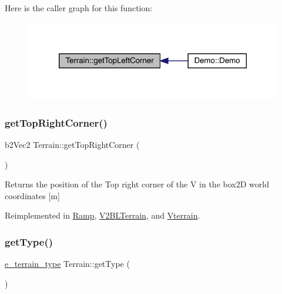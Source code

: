 Here is the caller graph for this function\+:\nopagebreak
\begin{figure}[H]
\begin{center}
\leavevmode
\includegraphics[width=320pt]{class_terrain_a8a8629396e5cb03961649acdc23eacf2_icgraph}
\end{center}
\end{figure}
\mbox{\label{class_terrain_a10fcf414cba83e769d99156fe16aa795}} 
\subsubsection{\texorpdfstring{get\+Top\+Right\+Corner()}{getTopRightCorner()}}
{\footnotesize\ttfamily b2\+Vec2 Terrain\+::get\+Top\+Right\+Corner (\begin{DoxyParamCaption}{ }\end{DoxyParamCaption})\hspace{0.3cm}{\ttfamily [virtual]}}

\begin{DoxyReturn}{Returns}
the position of the Top right corner of the V in the box2D world coordinates \mbox{[}m\mbox{]} 
\end{DoxyReturn}


Reimplemented in \mbox{\hyperlink{class_ramp_a72b5d41278e4ff65df8f80657ae7d9e1}{Ramp}}, \mbox{\hyperlink{class_v2_b_l_terrain_a2a3dc6ef761a5ab416669ce5f793558b}{V2\+B\+L\+Terrain}}, and \mbox{\hyperlink{class_vterrain_a27258a597b11a9cb78bd7e537fb037c4}{Vterrain}}.

\mbox{\label{class_terrain_a6cd1220b8e64466cc7a2219efff4141b}} 
\subsubsection{\texorpdfstring{get\+Type()}{getType()}}
{\footnotesize\ttfamily \mbox{\hyperlink{_terrain_8h_a6d0b7e83bb7325270c1162bece970fd8}{e\+\_\+terrain\+\_\+type}} Terrain\+::get\+Type (\begin{DoxyParamCaption}{ }\end{DoxyParamCaption})\hspace{0.3cm}{\ttfamily [virtual]}}

